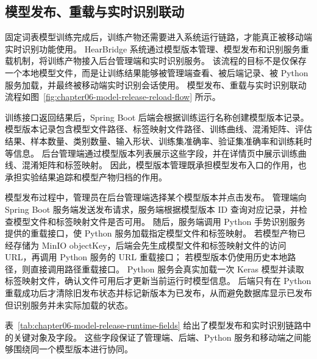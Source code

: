 
\subsection{模型发布、重载与实时识别联动}

固定词表模型训练完成后，训练产物还需要进入系统运行链路，才能真正被移动端实时识别功能使用。
HearBridge 系统通过模型版本管理、模型发布和识别服务重载机制，将训练产物接入后台管理端和实时识别服务。
该流程的目标不是仅保存一个本地模型文件，而是让训练结果能够被管理端查看、被后端记录、被 Python 服务加载，并最终被移动端实时识别会话使用。
模型发布、重载与实时识别联动流程如图~\ref{fig:chapter06-model-release-reload-flow} 所示。


训练接口返回结果后，Spring Boot 后端会根据训练运行名称创建模型版本记录。
模型版本记录包含模型文件路径、标签映射文件路径、训练曲线、混淆矩阵、评估结果、样本数量、类别数量、输入形状、训练集准确率、验证集准确率和训练耗时等信息。
后台管理端通过模型版本列表展示这些字段，并在详情页中展示训练曲线、混淆矩阵和标签映射。
因此，模型版本管理既承担模型发布入口的作用，也承担实验结果追踪和模型产物归档的作用。

模型发布过程中，管理员在后台管理端选择某个模型版本并点击发布。
管理端向 Spring Boot 服务端发送发布请求，服务端根据模型版本 ID 查询对应记录，并检查模型文件和标签映射文件是否可用。
随后，服务端调用 Python 手势识别服务提供的重载接口，使 Python 服务加载指定模型文件和标签映射。
若模型产物已经存储为 MinIO objectKey，后端会先生成模型文件和标签映射文件的访问 URL，再调用 Python 服务的 URL 重载接口；
若模型版本仍使用历史本地路径，则直接调用路径重载接口。
Python 服务会真实加载一次 Keras 模型并读取标签映射文件，确认文件可用后才更新当前运行时模型信息。
后端只有在 Python 重载成功后才清除旧发布状态并标记新版本为已发布，从而避免数据库显示已发布但识别服务并未实际加载的状态。

表~\ref{tab:chapter06-model-release-runtime-fields} 给出了模型发布和实时识别链路中的关键对象及字段。
这些字段保证了管理端、后端、Python 服务和移动端之间能够围绕同一个模型版本进行协同。

